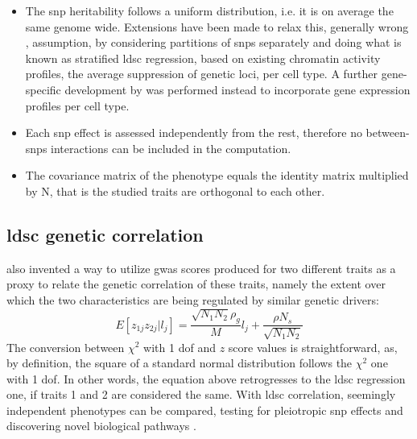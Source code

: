 \begin{itemize}
	\item{The \ac{snp} heritability follows a uniform distribution, i.e. it is on average the same genome wide. Extensions have been made to relax this, generally wrong \cite{Trynka2013}, assumption, by considering partitions of \acp{snp} separately and doing what is known as stratified \ac{ldsc} regression\cite{Finucane2015}, based on existing chromatin activity profiles, the average suppression of genetic loci, per cell type. A further gene-specific development by \citet{Finucane2018} was performed instead to incorporate gene expression profiles per cell type.}
	\item{Each \ac{snp} effect is assessed independently from the rest, therefore no between-\acp{snp} interactions can be included in the computation.}
	\item{The covariance matrix of the phenotype equals the identity matrix multiplied by N, that is the studied traits are orthogonal to each other.}
\end{itemize}

\subsection{\Ac{ldsc} genetic correlation}
\citet{Bulik-Sullivan2015_cor} also invented a way to utilize \ac{gwas} scores produced for two different traits as a proxy to relate the genetic correlation of these traits, namely the extent over which the two characteristics are being regulated by similar genetic drivers:
$$
E[z_{1j}z_{2j}|l_j] = \frac{\sqrt{N_1N_2}\rho_g}{M}l_j + \frac{\rho N_s}{\sqrt{N_1N_2}}
$$
The conversion between $\chi^2$ with 1 \ac{dof} and $z$ score values is straightforward, as, by definition, the square of a standard normal distribution follows the $\chi^2$ one with 1 \ac{dof}. In other words, the equation above retrogresses to the \ac{ldsc} regression one, if traits 1 and 2 are considered the same. With \ac{ldsc} correlation, seemingly independent phenotypes can be compared, testing for pleiotropic \ac{snp} effects and discovering novel biological pathways \cite{Bulik-Sullivan2015_cor}.

